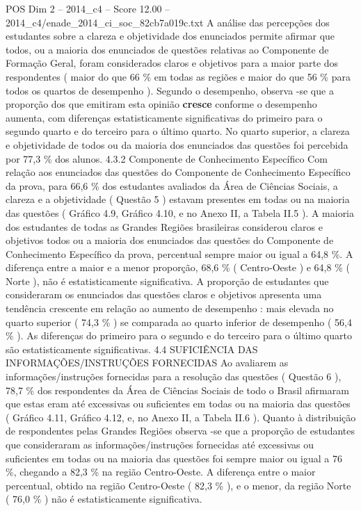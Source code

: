 \begin{textsample}{POS Dim 2 – 2014\_c4 – Score 12.00 – 2014\_c4/enade\_2014\_ci\_soc\_82cb7a019c.txt}
A análise das percepções dos estudantes sobre a clareza e objetividade dos enunciados permite afirmar que todos, ou a maioria dos enunciados de questões relativas ao Componente de Formação Geral, foram considerados claros e objetivos para a maior parte dos respondentes ( maior do que 66 \% em todas as regiões e maior do que 56 \% para todos os quartos de desempenho ).
Segundo o desempenho, observa -se que a proporção dos que emitiram esta opinião \textbf{cresce} conforme o desempenho aumenta, com diferenças estatisticamente significativas do primeiro para o segundo quarto e do terceiro para o último quarto.
No quarto superior, a clareza e objetividade de todos ou da maioria dos enunciados das questões foi percebida por 77,3 \% dos alunos. 4.3.2 Componente de Conhecimento Específico Com relação aos enunciados das questões do Componente de Conhecimento Específico da prova, para 66,6 \% dos estudantes avaliados da Área de Ciências Sociais, a clareza e a objetividade ( Questão 5 ) estavam presentes em todas ou na maioria das questões ( Gráfico 4.9, Gráfico 4.10, e no Anexo II, a Tabela II.5 ).
A maioria dos estudantes de todas as Grandes Regiões brasileiras considerou claros e objetivos todos ou a maioria dos enunciados das questões do Componente de Conhecimento Específico da prova, percentual sempre maior ou igual a 64,8 \%.
A diferença entre a maior e a menor proporção, 68,6 \% ( Centro-Oeste ) e 64,8 \% ( Norte ), não é estatisticamente significativa.
A proporção de estudantes que consideraram os enunciados das questões claros e objetivos apresenta uma tendência crescente em relação ao aumento de desempenho : mais elevada no quarto superior ( 74,3 \% ) se comparada ao quarto inferior de desempenho ( 56,4 \% ).
As diferenças do primeiro para o segundo e do terceiro para o último quarto são estatisticamente significativas. 4.4 SUFICIÊNCIA DAS INFORMAÇÕES/INSTRUÇÕES FORNECIDAS Ao avaliarem as informações/instruções fornecidas para a resolução das questões ( Questão 6 ), 78,7 \% dos respondentes da Área de Ciências Sociais de todo o Brasil afirmaram que estas eram até excessivas ou suficientes em todas ou na maioria das questões ( Gráfico 4.11, Gráfico 4.12, e, no Anexo II, a Tabela II.6 ).
Quanto à distribuição de respondentes pelas Grandes Regiões observa -se que a proporção de estudantes que consideraram as informações/instruções fornecidas até excessivas ou suficientes em todas ou na maioria das questões foi sempre maior ou igual a 76 \%, chegando a 82,3 \% na região Centro-Oeste.
A diferença entre o maior percentual, obtido na região Centro-Oeste ( 82,3 \% ), e o menor, da região Norte ( 76,0 \% ) não é estatisticamente significativa.

\end{textsample}
